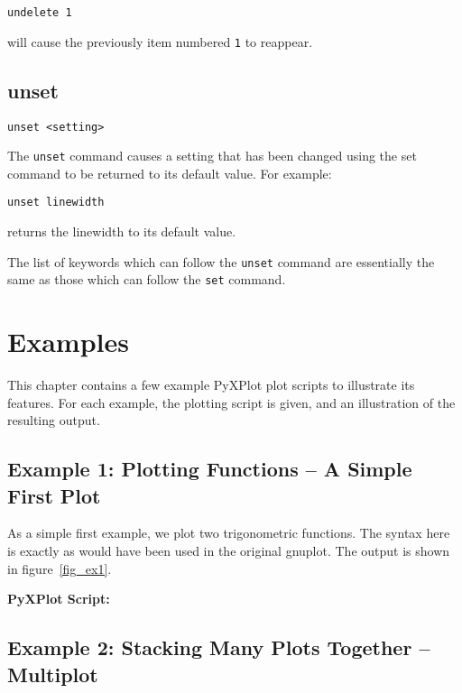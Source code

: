 \documentclass[a4paper,onecolumn,11pt]{book}
\begin{document}
\begin{verbatim}
undelete 1
\end{verbatim}

\noindent will cause the previously item numbered {\tt 1} to reappear.
  
\section{unset}

\begin{verbatim}
unset <setting>
\end{verbatim}

The {\tt unset} command causes a setting that has been changed using the set
command to be returned to its default value.  For example:

\begin{verbatim}
unset linewidth
\end{verbatim}

\noindent returns the linewidth to its default value.

The list of keywords which can follow the {\tt unset} command are essentially
the same as those which can follow the {\tt set} command.

\chapter{Examples}
\label{examples}

This chapter contains a few example PyXPlot plot scripts to illustrate its
features. For each example, the plotting script is given, and an illustration
of the resulting output.

\section{Example 1: Plotting Functions -- A Simple First Plot}

As a simple first example, we plot two trigonometric functions. The syntax here
is exactly as would have been used in the original gnuplot. The output is shown
in figure~\ref{fig_ex1}.

\vspace{1cm}
\noindent \textbf{PyXPlot Script:}


\newpage
\section{Example 2: Stacking Many Plots Together -- Multiplot}
\end{document}
